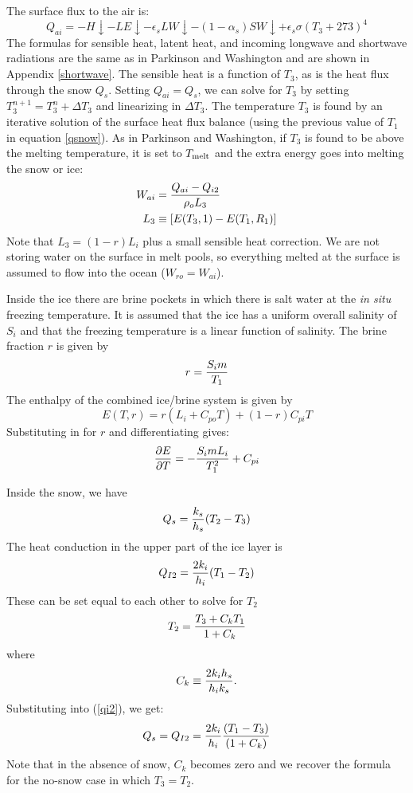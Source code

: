 The surface flux to the air is:
\begin{equation}
   Q_{ai} =  - H\!\downarrow - LE\!\downarrow -
       \epsilon_s LW\!\!\downarrow  -
      (1 - \alpha_s) SW\!\!\downarrow + \epsilon_s \sigma (T_3+273)^4
\end{equation}
The formulas for sensible heat, latent heat, and incoming longwave and
shortwave radiations are the same as in Parkinson and Washington
\cite{Parkinson} and
are shown in Appendix \ref{shortwave}. The sensible heat is a function
of $T_3$, as is the heat flux through the snow $Q_s$. Setting $Q_{ai} =
Q_s$, we can solve for $T_3$ by setting $T_3^{n+1} = T_3^n + \Delta
T_3$ and linearizing in $\Delta T_3$.  The temperature $T_3$ is found by
an iterative solution of the surface heat flux balance (using the
previous value of $T_1$ in equation \ref{qsnow}). As in Parkinson and
Washington, if $T_3$ is found to be above the melting temperature, it
is set to $T_{\rm melt}$ and the extra energy goes into melting the
snow or ice:
\begin{align}
   W_{ai} & = {Q_{ai} - Q_{i2} \over \rho_o L_3} \\
   L_3 & \equiv \left[ E(T_3,1) - E(T_1, R_1) \right]
\end{align}
Note that $L_3 = (1-r)L_i$ plus a small sensible heat correction.
We are not storing water on the surface in melt pools, so everything
melted at the surface is assumed to flow into the ocean ($W_{ro} =
W_{ai}$).

Inside the ice there are brine pockets in which there is salt water
at the {\it in situ} freezing temperature. It is assumed that the ice
has a uniform overall salinity of $S_i$ and that the freezing
temperature is a linear function of salinity. The brine fraction $r$ is
given by
$$
  r = {S_i m \over T_1}
$$
The enthalpy of the combined ice/brine system is given by
\begin{equation}
  E(T,r) = r(L_i + C_{po}T) + (1-r) C_{pi} T
\end{equation}
Substituting in for $r$ and differentiating gives:
\begin{equation}
  {\partial E \over \partial T} = - {S_i m L_i \over T_1^2} + C_{pi}
\end{equation}

Inside the snow, we have
\begin{equation}
   Q_s = {k_s \over h_s} (T_2 - T_3)
\end{equation}
The heat conduction in the upper part of the ice layer is
\begin{equation}
   Q_{I2} = { 2 k_i \over h_i} (T_1 - T_2)
   \label{qi2}
\end{equation}
These can be set equal to each other to solve for $T_2$
\begin{equation}
   T_2 = {T_3 + C_k T_1 \over 1 + C_k}
\end{equation}
where
$$
  C_k \equiv {2 k_i h_s \over h_i k_s}.
$$
Substituting into (\ref{qi2}), we get:
\begin{equation}
  Q_s = Q_{I2} = {2k_i \over h_i} {(T_1 - T_3) \over (1 + C_k)}
\label{qsnow}
\end{equation}
Note that in the absence of snow, $C_k$ becomes zero and we recover the
formula for the no-snow case in which $T_3 = T_2$.

